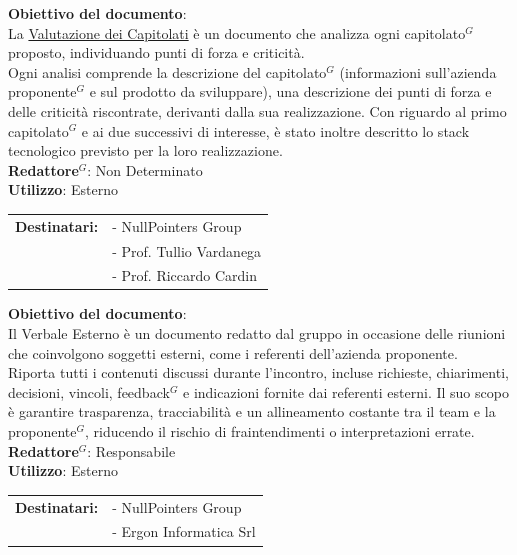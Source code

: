	\textbf{Obiettivo del documento}:\\
	La \href{https://nullpointersgroup.github.io/Documentazione/output/Candidatura/Valutazione_Capitolati.pdf}{Valutazione dei Capitolati} è un documento che analizza ogni capitolato$^G$ proposto, individuando punti di forza e criticità.\\
	Ogni analisi comprende la descrizione del capitolato$^G$ (informazioni sull’azienda proponente$^G$ e sul prodotto da sviluppare), una descrizione dei punti di forza e delle criticità riscontrate, derivanti dalla sua realizzazione. Con riguardo al primo capitolato$^G$ e ai due successivi di interesse, è stato inoltre descritto lo stack tecnologico previsto per la loro realizzazione.\\[0.5em]
	\medskip
	\textbf{Redattore$^G$}: Non Determinato\\
	\medskip
	\textbf{Utilizzo}: Esterno\\
	\medskip 
	\begin{tabular}{@{}l l}
		\textbf{Destinatari:} & - NullPointers Group\\
		                      & - Prof. Tullio Vardanega\\
							  & - Prof. Riccardo Cardin
	\end{tabular}

	\textbf{Obiettivo del documento}:\\
	Il Verbale Esterno è un documento redatto dal gruppo in occasione delle riunioni che coinvolgono soggetti esterni, come i referenti dell’azienda proponente.\\
	Riporta tutti i contenuti discussi durante l’incontro, incluse richieste, chiarimenti, decisioni, vincoli, feedback$^G$ e indicazioni fornite dai referenti esterni. Il suo scopo è garantire trasparenza, tracciabilità e un allineamento costante tra il team e la proponente$^G$, riducendo il rischio di fraintendimenti o interpretazioni errate.\\[0.5em]
	\medskip
	\textbf{Redattore$^G$}: Responsabile\\
	\medskip
	\textbf{Utilizzo}: Esterno\\
	\medskip 
	\begin{tabular}{@{}l l}
		\textbf{Destinatari:} & - NullPointers Group\\
		                      & - Ergon Informatica Srl
	\end{tabular}

